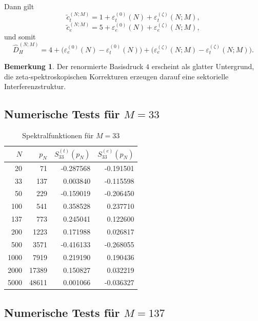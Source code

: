 \documentclass[a4paper,12pt]{article}
\theoremstyle{definition}
\newtheorem{bemerkung}[satz]{Bemerkung}
\numberwithin{equation}{section}
\begin{document}
	Dann gilt
	\[
	\tilde c_t^{(N;M)}
	=
	1+\varepsilon_t^{(0)}(N)+\varepsilon_t^{(\zeta)}(N;M),
	\]
	\[
	\tilde c_e^{(N;M)}
	=
	5+\varepsilon_e^{(0)}(N)+\varepsilon_e^{(\zeta)}(N;M),
	\]
	und somit
	\begin{equation}
		\widehat D_H^{(N;M)}
		=
		4+\bigl(\varepsilon_e^{(0)}(N)-\varepsilon_t^{(0)}(N)\bigr)
		+\bigl(\varepsilon_e^{(\zeta)}(N;M)-\varepsilon_t^{(\zeta)}(N;M)\bigr).
	\end{equation}
	
	\begin{bemerkung}
		Der renormierte Basisdruck \(4\) erscheint als glatter Untergrund, die zeta-spektroskopischen Korrekturen erzeugen darauf eine sektorielle Interferenzstruktur.
	\end{bemerkung}
	
	\subsection{Numerische Tests für \(M=33\)}
	
	\begin{table}[htbp]
		\centering
		\caption{Spektralfunktionen für \(M=33\)}
		\begin{tabular}{@{}rrrr@{}}
			\toprule
			\(N\) & \(p_N\) & \(S_{33}^{(t)}(p_N)\) & \(S_{33}^{(e)}(p_N)\) \\
			\midrule
			20   & 71    & -0.287568 & -0.191501 \\
			33   & 137   & \phantom{-}0.003840 & -0.115598 \\
			50   & 229   & -0.159019 & -0.206450 \\
			100  & 541   & \phantom{-}0.358528 & \phantom{-}0.237710 \\
			137  & 773   & \phantom{-}0.245041 & \phantom{-}0.122600 \\
			200  & 1223  & \phantom{-}0.171988 & \phantom{-}0.026817 \\
			500  & 3571  & -0.416133 & -0.268055 \\
			1000 & 7919  & \phantom{-}0.219190 & \phantom{-}0.190436 \\
			2000 & 17389 & \phantom{-}0.150827 & \phantom{-}0.032219 \\
			5000 & 48611 & \phantom{-}0.001066 & -0.036327 \\
			\bottomrule
		\end{tabular}
	\end{table}
	
	\subsection{Numerische Tests für \(M=137\)}
	
\end{document}
